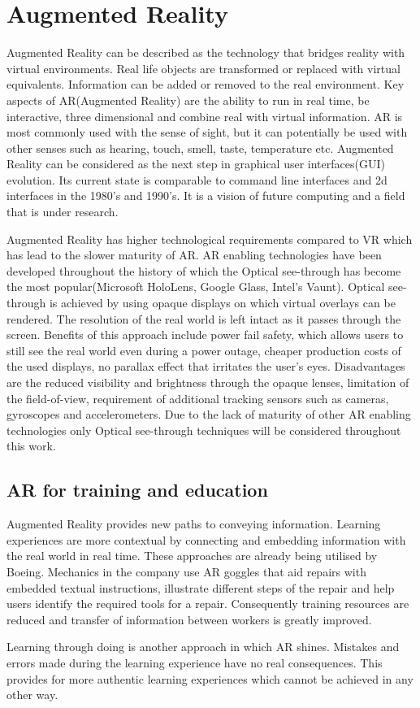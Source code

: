 \documentclass[12pt, a4paper,oneside, nocenter]{thesis}
\begin{document}
\section{Augmented Reality}%
Augmented Reality can be described as the technology that bridges reality with virtual environments. Real life objects are transformed or replaced with virtual equivalents. Information can be added or removed to the real environment. Key aspects of AR(Augmented Reality) are the ability to run in real time, be interactive, three dimensional and combine real with virtual information. AR is most commonly used with the sense of sight, but it can potentially be used with other senses such as hearing, touch, smell, taste, temperature etc. Augmented Reality can be considered as the next step in graphical user interfaces(GUI) evolution\citep{prototyping-ar}. Its current state is comparable to command line interfaces and 2d interfaces in the 1980's and 1990's. It is a vision of future computing and a field that is under research.\par
Augmented Reality has higher technological requirements compared to VR which has lead to the slower maturity of AR. AR enabling technologies have been developed throughout the history of which the Optical see-through has become the most popular(Microsoft HoloLens, Google Glass, Intel's Vaunt). Optical see-through is achieved by using opaque displays on which virtual overlays can be rendered. The resolution of the real world is left intact as it passes through the screen. Benefits of this approach include power fail safety, which allows users to still see the real world even during a power outage, cheaper production costs of the used displays, no parallax effect that irritates the user's eyes. Disadvantages are the reduced visibility and brightness through the opaque lenses, limitation of the field-of-view, requirement of additional tracking sensors such as cameras, gyroscopes and accelerometers. Due to the lack of maturity of other AR enabling technologies only Optical see-through techniques will be considered throughout this work\citep{vrjournal}.
\subsection{AR for training and education}%
Augmented Reality provides new paths to conveying information. Learning experiences are more contextual by connecting and embedding information with the real world in real time. These approaches are already being utilised by Boeing. 
Mechanics in the company use AR goggles that aid repairs with embedded textual instructions, 
illustrate different steps of the repair and help users identify the required tools for a repair. 
Consequently training resources are reduced and transfer of information between workers is greatly 
improved\citep{horizon-report}.\par
Learning through doing is another approach in which AR shines. Mistakes and errors made during the learning
experience have no real consequences. This provides for more authentic learning experiences which cannot be
achieved in any other way\citep{augmented-reality}.
\end{document}
